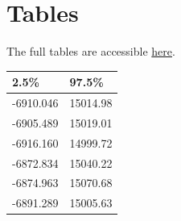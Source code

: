 \documentclass[11pt, oneside]{article}
\begin{document}
\section*{Tables}
The full tables are accessible  \href{https://github.com/thetruejacob/CS112/blob/master/Assignment/Assignment 2.ipynb}{here}.
\begin{table}[h]
\begin{tabular}{|l|l|}
\hline
\textbf{2.5\%} & \textbf{97.5\%} \\ \hline
-6910.046      & 15014.98        \\ \hline
-6905.489      & 15019.01        \\ \hline
-6916.160      & 14999.72        \\ \hline
-6872.834      & 15040.22        \\ \hline
-6874.963      & 15070.68        \\ \hline
-6891.289      & 15005.63        \\ \hline
\end{tabular}
\end{table}
\end{document}
